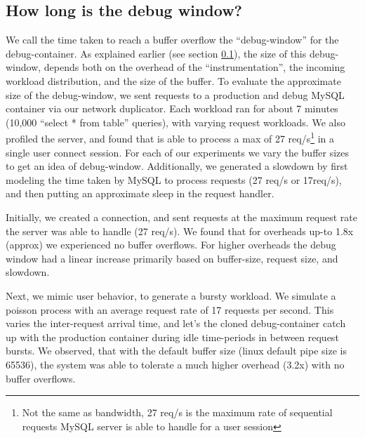 	


\subsection{How long is the debug window?}
\label{sec:timewindowPerformance}

\noindent
We call the time taken to reach a buffer overflow the ``debug-window'' for the debug-container.
As explained earlier (see section \ref{sec:timewindowPerformance}), the size of this debug-window, depends both on the overhead of the ``instrumentation'', the incoming workload distribution, and the size of the buffer.
To evaluate the approximate size of the debug-window, we sent requests to a production and debug MySQL container via our network duplicator.
Each workload ran for about 7 minutes (10,000 ``select * from table'' queries), with varying request workloads.
%
We also profiled the server, and found that is able to process a max of 27 req/s\footnote{Not the same as bandwidth, 27 req/s is the maximum rate of sequential requests MySQL server is able to handle for a user session} in a single user connect session. 
For each of our experiments we vary the buffer sizes to get an idea of debug-window. 
Additionally, we generated a slowdown by first modeling the time taken by MySQL to process requests (27 req/s or 17req/s), and then putting an approximate sleep in the request handler.

Initially, we created a connection, and sent requests at the maximum request rate the server was able to handle (27 req/s).
We found that for overheads up-to 1.8x (approx) we experienced no buffer overflows.
For higher overheads the debug window had a linear increase primarily based on buffer-size, request size, and slowdown.

Next, we mimic user behavior, to generate a bursty workload.
We simulate a poisson process with an average request rate of 17 requests per second. 
This varies the inter-request arrival time, and let's the cloned debug-container catch up with the production container during idle time-periods in between request bursts.
We observed, that with the default buffer size (linux default pipe size is 65536), the system was able to tolerate a much higher overhead (3.2x) with no buffer overflows.

